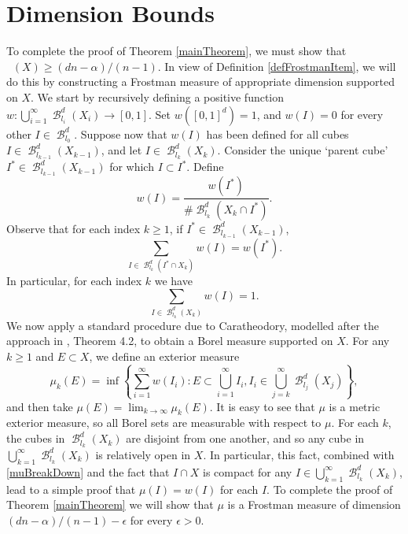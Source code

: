 \documentclass[dvipsnames,letterpaper,12pt]{article}
\numberwithin{equation}{section}
\theoremstyle{plain}
\theoremstyle{remark}
\DeclareMathOperator{\hausdim}{\dim_{\mathbf{H}}}
\DeclareMathOperator{\B}{\mathcal{B}}
\begin{document}
\section{Dimension Bounds}\label{dimensionsection}

To complete the proof of Theorem \ref{mainTheorem}, we must show that $\hausdim(X) \geq (dn - \alpha)/(n - 1)$. In view of Definition \ref{defFrostmanItem}, we will do this by constructing a Frostman measure of appropriate dimension supported on $X$. We start by recursively defining a positive function $w: \bigcup_{i = 1}^\infty \B^d_{l_i}(X_i) \to [0,1]$. Set $w([0,1]^d) = 1$, and $w(I) = 0$ for every other $I \in \B^d_{l_0}$. Suppose now that $w(I)$ has been defined for all cubes $I \in \B^d_{l_{k-1}}(X_{k-1})$, and let $I \in \B^d_{l_k}(X_k)$. Consider the unique `parent cube' $I^* \in \B^d_{l_{k-1}}(X_{k-1})$ for which $I \subset I^*$. Define
%
\begin{equation} \label{muRecurse}
	w(I) = \frac{w(I^*)}{\# \B^d_{l_k}(X_k \cap I^*)}.
\end{equation}
%
Observe that for each index $k \geq 1$, if $I^* \in \B_{l_{k-1}}^d(X_{k-1})$, 
%
\begin{equation}\label{muBreakDown}
	\sum_{I \in \B_{l_k}^d(I^* \cap X_k)} w(I) = w(I^*).
\end{equation}
%
In particular, for each index $k$ we have
%
\[ \sum_{I \in \B_{l_k}^d(X_k)} w(I) = 1. \]
%
We now apply a standard procedure due to Caratheodory, modelled after the approach in \cite{Mattila}, Theorem 4.2, to obtain a Borel measure supported on $X$. For any $k \geq 1$ and $E \subset X$, we define an exterior measure
%
\[ \mu_k(E) = \inf \left\{ \sum_{i = 1}^\infty w(I_i) : E \subset \bigcup_{i = 1}^\infty I_i, I_i \in \bigcup_{j = k}^\infty \B_{l_j}^d(X_j) \right\}, \]
%
and then take $\mu(E) = \lim_{k \to \infty} \mu_k(E)$. It is easy to see that $\mu$ is a metric exterior measure, so all Borel sets are measurable with respect to $\mu$. For each $k$, the cubes in $\B_{l_k}^d(X_k)$ are disjoint from one another, and so any cube in $\bigcup_{k = 1}^\infty \B_{l_k}^d(X_k)$ is relatively open in $X$. In particular, this fact, combined with \eqref{muBreakDown} and the fact that $I \cap X$ is compact for any $I \in \bigcup_{k = 1}^\infty \B_{l_k}^d(X_k)$, lead to a simple proof that $\mu(I) = w(I)$ for each $I$. To complete the proof of Theorem \ref{mainTheorem} we will show that $\mu$ is a Frostman measure of dimension $(dn - \alpha)/(n - 1)-\epsilon$ for every $\epsilon>0$. 
\end{document}
